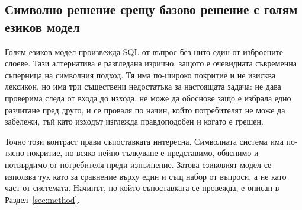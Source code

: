 \subsection{Символно решение срещу базово решение с голям езиков модел}

Голям езиков модел произвежда SQL от въпрос без нито един от изброените слоеве. Тази
алтернатива е разгледана изрично, защото е очевидната съвременна съперница на
символния подход. Тя има по-широко покритие и не изисква лексикон, но има три
съществени недостатъка за настоящата задача: не дава проверима следа от входа до
изхода, не може да обоснове защо е избрала едно разчитане пред друго, и се проваля по
начин, който потребителят не може да забележи, тъй като изходът изглежда правдоподобен
и когато е грешен.

Точно този контраст прави съпоставката интересна. Символната система има по-тясно
покритие, но всяко нейно тълкуване е представимо, обяснимо и потвърдимо от потребителя
преди изпълнение. Затова езиковият модел се използва тук като  за
сравнение върху един и същ набор от въпроси, а не като част от системата. Начинът, по
който съпоставката се провежда, е описан в Раздел~\ref{sec:method}.
